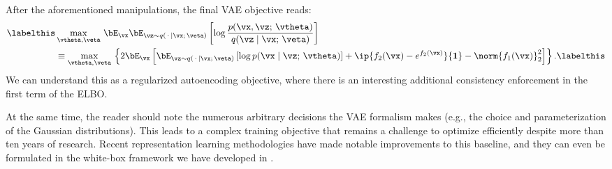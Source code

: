 \documentclass[../../book-main.tex]{subfiles}
\begin{document}
After the aforementioned manipulations, the final VAE objective reads:
\begin{align*}\labelthis\label{eq:elbo-objective}
&\max_{\vtheta, \veta}\,
\bE_{\vx}
\bE_{\vz \sim q(\,\cdot\, \mid \vx ;\, \veta)} \left[
  \log \frac{p(\vx, \vz;\, \vtheta)}{q(\vz \mid \vx;\, \veta)}
\right]\\
&\equiv
\max_{\vtheta, \veta}\,
\left\{
  2\bE_{\vx}\left[
    \bE_{\vz \sim q(\,\cdot\, \mid \vx ;\, \veta)} \left[
      \log p(\vx \mid \vz;\, \vtheta)
    \right]
    + \ip{ f_2(\vx) - e^{f_2(\vx)}}{\mathbf{1}}
    - \norm{f_1(\vx)}_2^2
  \right]
\right\}. \labelthis \label{eq:elbo-for-gaussians}
\end{align*}
We can understand this as a regularized autoencoding objective, where there is
an interesting additional consistency enforcement in the first term of the ELBO.

At the same time, the reader should note the numerous arbitrary decisions
the VAE formalism makes (e.g., the choice and parameterization of the Gaussian
distributions). This leads to a complex training objective that remains
a challenge to optimize efficiently despite more than ten years of research.
Recent representation learning methodologies have made notable improvements to
this baseline, and they can even be formulated in the white-box framework we
have developed in .
\end{document}
